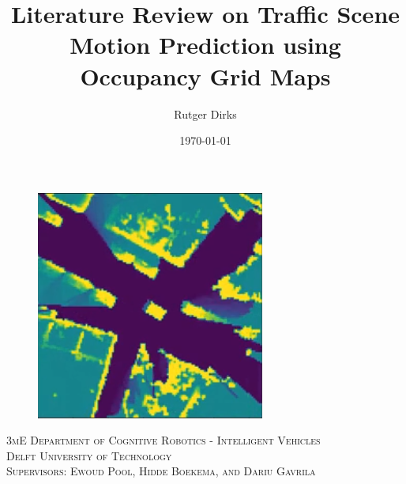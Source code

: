 \documentclass[a4paper]{article}
\title{Literature Review on Traffic Scene Motion Prediction using Occupancy Grid Maps}
\author{Rutger Dirks}
\date{\today{}}
\begin{document}
	\selectfont %
	
	\begin{titlepage}

		\maketitle{}
		
		\begin{figure}[h]
			\centering
			\includegraphics[width=0.6\linewidth]{Figures/Title_Page_OGM}
			\label{fig:title_page}
		\end{figure}
		
		\begin{center}
			\textsc{3mE Department of Cognitive Robotics - Intelligent Vehicles}\\[1cm]
			\textsc{\LARGE Delft University of Technology}\\[1cm]
			\textsc{Supervisors: Ewoud Pool, Hidde Boekema, and Dariu Gavrila}\\[5cm]
		\end{center}


		

	\end{titlepage}
	 \selectfont	
	\newpage
	\printnoidxglossary[type=acronym]
	\printacronyms
	\newpage
	\tableofcontents{}	
	\newpage	
	
	\newpage
	
	\newpage
	
	\newpage
	
	\newpage
	
	\newpage
	
	\newpage
	\appendix
	
	\newpage
	
	
	
	\newpage
	
	
	
	
	
\end{document}
